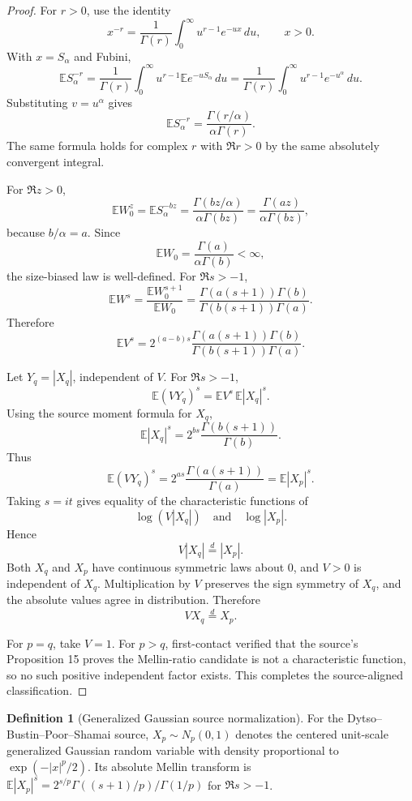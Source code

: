 \documentclass[11pt]{article}
\numberwithin{equation}{section}
\theoremstyle{definition}
\newtheorem{definition}{Definition}[section]
\theoremstyle{remark}
\newcommand{\1}{\mathbf 1}
\begin{document}
\begin{proof}
For \(r>0\), use the identity
\[
x^{-r}=\frac1{\Gamma(r)}\int_0^\infty u^{r-1}e^{-ux}\,du,\qquad x>0.
\]
With \(x=S_\alpha\) and Fubini,
\[
\mathbb E S_\alpha^{-r}
=
\frac1{\Gamma(r)}\int_0^\infty u^{r-1}\mathbb E e^{-uS_\alpha}\,du
=
\frac1{\Gamma(r)}\int_0^\infty u^{r-1}e^{-u^\alpha}\,du.
\]
Substituting \(v=u^\alpha\) gives
\[
\mathbb E S_\alpha^{-r}
=
\frac{\Gamma(r/\alpha)}{\alpha\Gamma(r)}.
\]
The same formula holds for complex \(r\) with \(\Re r>0\) by the same absolutely convergent integral.

For \(\Re z>0\),
\[
\mathbb E W_0^z
=
\mathbb E S_\alpha^{-bz}
=
\frac{\Gamma(bz/\alpha)}{\alpha\Gamma(bz)}
=
\frac{\Gamma(az)}{\alpha\Gamma(bz)},
\]
because \(b/\alpha=a\). Since
\[
\mathbb E W_0=\frac{\Gamma(a)}{\alpha\Gamma(b)}<\infty,
\]
the size-biased law is well-defined. For \(\Re s>-1\),
\[
\mathbb E W^s
=
\frac{\mathbb E W_0^{s+1}}{\mathbb E W_0}
=
\frac{\Gamma(a(s+1))\Gamma(b)}
        {\Gamma(b(s+1))\Gamma(a)}.
\]
Therefore
\[
\mathbb E V^s
=
2^{(a-b)s}
\frac{\Gamma(a(s+1))\Gamma(b)}
     {\Gamma(b(s+1))\Gamma(a)}.
\]

Let \(Y_q=|X_q|\), independent of \(V\). For \(\Re s>-1\),
\[
\mathbb E (VY_q)^s
=
\mathbb E V^s\,\mathbb E |X_q|^s.
\]
Using the source moment formula for \(X_q\),
\[
\mathbb E |X_q|^s
=
2^{bs}\frac{\Gamma(b(s+1))}{\Gamma(b)}.
\]
Thus
\[
\mathbb E (VY_q)^s
=
2^{as}\frac{\Gamma(a(s+1))}{\Gamma(a)}
=
\mathbb E |X_p|^s.
\]
Taking \(s=it\) gives equality of the characteristic functions of
\[
\log(V|X_q|)
\quad\text{and}\quad
\log|X_p|.
\]
Hence
\[
V|X_q|\stackrel d=|X_p|.
\]
Both \(X_q\) and \(X_p\) have continuous symmetric laws about \(0\), and \(V>0\) is independent of \(X_q\). Multiplication by \(V\) preserves the sign symmetry of \(X_q\), and the absolute values agree in distribution. Therefore
\[
VX_q\stackrel d=X_p.
\]

For \(p=q\), take \(V=1\). For \(p>q\), first-contact verified that the source's Proposition 15 proves the Mellin-ratio candidate is not a characteristic function, so no such positive independent factor exists. This completes the source-aligned classification.
\end{proof}

\begin{definition}[Generalized Gaussian source normalization]
\label{res:generalizedgaussian-np01}
For the Dytso--Bustin--Poor--Shamai source, \(X_p\sim N_p(0,1)\) denotes the centered unit-scale generalized Gaussian random variable with density proportional to \(\exp(-|x|^p/2)\). Its absolute Mellin transform is \(\mathbb E|X_p|^s=2^{s/p}\Gamma((s+1)/p)/\Gamma(1/p)\) for \(\Re s>-1\).
\end{definition}
\end{document}
